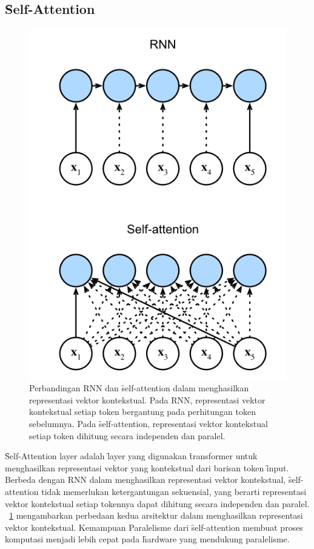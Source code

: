 	\subsection{\f{Self-Attention}}
	\begin{figure}
		\centering
		\includegraphics[width=1\textwidth]{assets/pics/rnn-compare-selfattention.png}
		\caption{Perbandingan RNN dan \f{self-attention} dalam menghasilkan representasi vektor kontekstual. Pada RNN, representasi vektor kontekstual setiap token bergantung pada perhitungan token sebelumnya. Pada \f{self-attention}, representasi vektor kontekstual setiap token dihitung secara independen dan paralel.}
		\label{fig:self-attention-rnn}
	\end{figure}

	\f{Self-Attention layer} adalah \f{layer} yang digunakan \f{transformer} untuk menghasilkan representasi vektor yang kontekstual dari barisan token \f{input}. Berbeda dengan RNN dalam menghasilkan representasi vektor kontekstual, \f{self-attention} tidak memerlukan ketergantungan sekuensial, yang berarti representasi vektor kontekstual setiap tokennya dapat dihitung secara independen dan paralel. \pic~\ref{fig:self-attention-rnn} mengambarkan perbedaan kedua arsitektur dalam menghasilkan representasi vektor kontekstual. Kemampuan Paralelisme dari \f{self-attention} membuat proses komputasi menjadi lebih cepat pada \f{hardware} yang mendukung paralelisme. 

